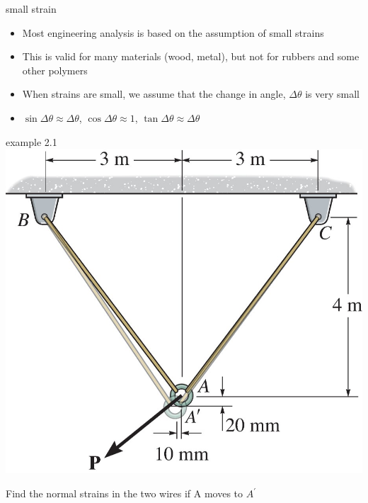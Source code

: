 \documentclass[
  letterpaper,
  ignorenonframetext,
  aspectratio=43,
  handout,
  12pt]{beamer}
\providecommand{\tightlist}{%
  \setlength{\itemsep}{0pt}\setlength{\parskip}{0pt}}
\providecommand{\tightlist}{%
\setlength{\itemsep}{0pt}\setlength{\parskip}{0pt}}
\let\Oldincludegraphics\includegraphics
\renewcommand{\includegraphics}[2][]{\Oldincludegraphics[width=\textwidth,height=0.7\textheight,keepaspectratio]{#2}}
\begin{document}
\begin{frame}{small strain}
\protect\hypertarget{small-strain}{}
\begin{itemize}
\tightlist
\item
  Most engineering analysis is based on the assumption of small strains
\item
  This is valid for many materials (wood, metal), but not for rubbers
  and some other polymers
\item
  When strains are small, we assume that the change in angle,
  \(\Delta \theta\) is very small
\item
  \(\sin \Delta \theta \approx \Delta \theta\),
  \(\cos\Delta \theta \approx 1\),
  \(\tan\Delta \theta\approx \Delta \theta\)
\end{itemize}
\end{frame}

\begin{frame}{example 2.1}
\protect\hypertarget{example-2.1}{}
\includegraphics{../images/example-2-1.jpg}

Find the normal strains in the two wires if A moves to \(A^\prime\)
\end{frame}
\end{document}
